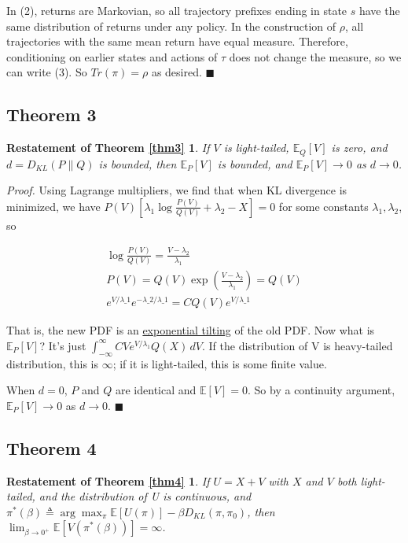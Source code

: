 \documentclass{article}
\begin{document}
In (2), returns are Markovian, so all trajectory prefixes ending in
state \(s\) have the same distribution of returns under any policy. In
the construction of \(\rho\), all trajectories with the same mean return
have equal measure. Therefore, conditioning on earlier states and
actions of \(\tau\) does not change the measure, so we can write (3). So
\(Tr(\pi)=\rho\) as desired. \(\blacksquare\)

\subsection{Theorem 3}
\newtheorem*{theorem3}{Restatement of Theorem \ref{thm3}}
\begin{theorem3} If \(V\) is light-tailed, \(\mathbb E_Q[V]\)
is zero, and \(d = D_{KL}(P \| Q)\) is bounded, then
\(\mathbb E_P[V]\) is bounded, and \(\mathbb E_P[V] \to 0\) as
\(d \to 0\).
\end{theorem3}

\emph{Proof.} Using Lagrange multipliers, we find that when KL divergence is
minimized, we have
\(P(V) [\lambda_1 \log \frac{P(V)}{Q(V)} + \lambda_2 - X] = 0\) for some
constants \(\lambda_1, \lambda_2\), so

\begin{align}\log \frac{P(V)}{Q(V)} = \frac{V - \lambda_2}{\lambda_1}
\\ P(V) = Q(V)\exp\left(\frac{V - \lambda_2}{\lambda_1}\right) = Q(V)
\\ e^{V/\lambda\_1} e^{-\lambda\_2/\lambda\_1} = C Q(V)
e^{V/\lambda\_1}
\end{align}

That is, the new PDF is an
\href{https://en.wikipedia.org/wiki/Exponential_tilting}{exponential
tilting} of the old PDF. Now what is \(\mathbb E_P[V]\)? It's just
\(\int_{-\infty}^{\infty} C V e^{V/\lambda_1} Q(X) \,dV\). If the
distribution of V is heavy-tailed distribution, this is \(\infty\); if
it is light-tailed, this is some finite value.

When \(d = 0\), \(P\) and \(Q\) are identical and \(\mathbb E[V] = 0\).
So by a continuity argument, \(\mathbb E_P[V] \to 0\) as \(d \to 0\).
\(\blacksquare\)

\subsection{Theorem 4}

\newtheorem*{theorem4}{Restatement of Theorem \ref{thm4}}
\begin{theorem4}
If \(U=X+V\) with \(X\) and \(V\) both
light-tailed, and the distribution of U is continuous, and
\(\pi^*(\beta) \triangleq \arg \max_\pi \mathbb E[U(\pi)] - \beta D_{KL}(\pi, \pi_0)\),
then \(\lim_{\beta \to 0^+} \mathbb E[V(\pi^*(\beta))] = \infty\).
\end{theorem4}
\end{document}
